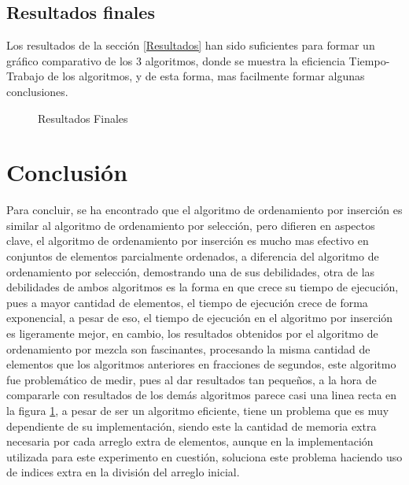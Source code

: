 \documentclass[twocolumn,english,journal]{IEEEtran}
\begin{document}
\subsection{Resultados finales}
Los resultados de la sección \ref{Resultados} han sido suficientes para formar un gráfico comparativo de los 3 algoritmos, donde se muestra la eficiencia Tiempo-Trabajo de los algoritmos, y de esta forma, mas facilmente formar algunas conclusiones.
\begin{figure}
\caption{Resultados Finales \label{ResultadosFinales}}
\end{figure}

\section{Conclusión}
Para concluir, se ha encontrado que el algoritmo de ordenamiento por inserción es similar al algoritmo de ordenamiento por selección, pero difieren en aspectos clave, el algoritmo de ordenamiento por inserción es mucho mas efectivo en conjuntos de elementos parcialmente ordenados, a diferencia del algoritmo de ordenamiento por selección, demostrando una de sus debilidades, otra de las debilidades de ambos algoritmos es la forma en que crece su tiempo de ejecución, pues a mayor cantidad de elementos, el tiempo de ejecución crece de forma exponencial, a pesar de eso, el tiempo de ejecución en el algoritmo por inserción es ligeramente mejor, en cambio, los resultados obtenidos por el algoritmo de ordenamiento por mezcla son fascinantes, procesando la misma cantidad de elementos que los algoritmos anteriores en fracciones de segundos, este algoritmo fue problemático de medir, pues al dar resultados tan pequeños, a la hora de compararle con resultados de los demás algoritmos parece casi una linea recta en la figura \ref{ResultadosFinales}, a pesar de ser un algoritmo eficiente, tiene un problema que es muy dependiente de su implementación, siendo este la cantidad de memoria extra necesaria por cada arreglo extra de elementos, aunque en la implementación utilizada para este experimento en cuestión, soluciona este problema haciendo uso de indices extra en la división del arreglo inicial.
\end{document}
